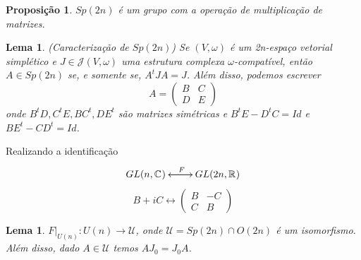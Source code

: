 \documentclass{beamer}
\newtheorem{lema}[teorema]{Lema}
\newtheorem{proposicao}[teorema]{Proposição}
\newcommand{\complexo}[1]{\mathbb{C}^{#1}}
\newcommand{\estruturacomplexa}{J_{0}}
\newcommand{\estruturascomplexaspadrao}{\mathcal{J}(V, \omega)}
\newcommand{\generalgroup}[2]{GL(#1, #2)}
\newcommand{\generalgroupreal}[1]{\generalgroup{#1}{\real{}}}
\newcommand{\generalgroupcomplexo}[1]{\generalgroup{#1}{\complexo{}}}
\newcommand{\gruposimpletico}[1]{Sp(#1)}
\newcommand{\matrizortogonal}[1]{O(#1)}
\newcommand{\matrizSimpleticaOrtogonal}{\mathcal{U}}
\newcommand{\matrizunitaria}[1]{U(#1)}
\newcommand{\real}[1]{\mathbb{R}^{#1}}
\begin{document}
\begin{frame}
	\begin{proposicao}
		$\gruposimpletico{2n}$ é um grupo com a operação de multiplicação de matrizes.
	\end{proposicao}
	
	\begin{lema}
		(Caracterização de $Sp(2n)$) Se $(V, \omega)$ é um 2n-espaço vetorial simplético e $J \in \estruturascomplexaspadrao$ uma estrutura complexa $\omega$-compatível, então $A\in Sp(2n)$ se, e somente se, $A^{t}JA = J$. Além disso, podemos escrever 
		$$
		A=
		\left(
		\begin{array}{cc}
		B & C
		\\
		D & E
		\end{array}
		\right)
		$$
		onde $B^{t}D, C^{t}E, BC^{t}, DE^{t} $ são matrizes simétricas e $B^{t}E - D^{t}C = Id$ e $BE^{t} - CD^{t} = Id$.
	\end{lema}
\end{frame}

\begin{frame}
	Realizando a identificação
	$$
	\xymatrix{
		 \generalgroupcomplexo{n}\ar[r]^{F}&\generalgroupreal{2n}\ar[l]
	}
	$$
	$$
	B+iC \leftrightarrow
	\left(
	\begin{array}{cc}
	B & -C
	\\
	C & B
	\end{array}
	\right)
	$$  
	\begin{lema}
		$F|_{\matrizunitaria{n}}: \matrizunitaria{n} \to \matrizSimpleticaOrtogonal $, onde $\matrizSimpleticaOrtogonal  = \gruposimpletico{2n}\cap \matrizortogonal{2n}$ é um isomorfismo. Além disso, dado $A \in \matrizSimpleticaOrtogonal $ temos $A\estruturacomplexa=\estruturacomplexa A$.
	\end{lema}
\end{frame}
\end{document}

